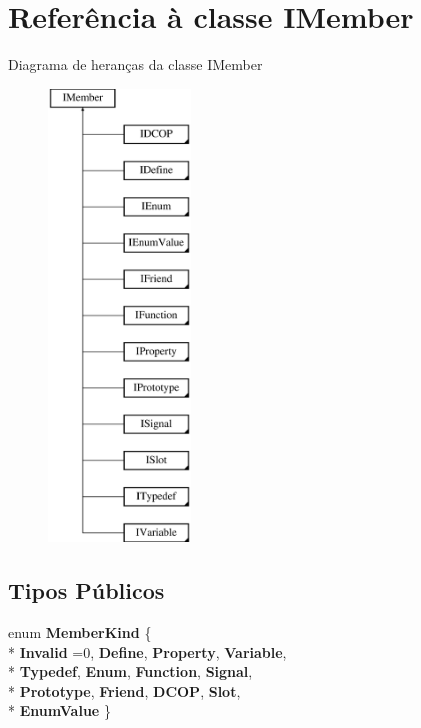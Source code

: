 \hypertarget{class_i_member}{\section{Referência à classe I\-Member}
\label{class_i_member}
}
Diagrama de heranças da classe I\-Member\begin{figure}[H]
\begin{center}
\leavevmode
\includegraphics[height=12.000000cm]{class_i_member}
\end{center}
\end{figure}
\subsection*{Tipos Públicos}
\begin{DoxyCompactItemize}
\item 
enum {\bfseries Member\-Kind} \{ \\*
{\bfseries Invalid} =0, 
{\bfseries Define}, 
{\bfseries Property}, 
{\bfseries Variable}, 
\\*
{\bfseries Typedef}, 
{\bfseries Enum}, 
{\bfseries Function}, 
{\bfseries Signal}, 
\\*
{\bfseries Prototype}, 
{\bfseries Friend}, 
{\bfseries D\-C\-O\-P}, 
{\bfseries Slot}, 
\\*
{\bfseries Enum\-Value}
 \}
\end{DoxyCompactItemize}

